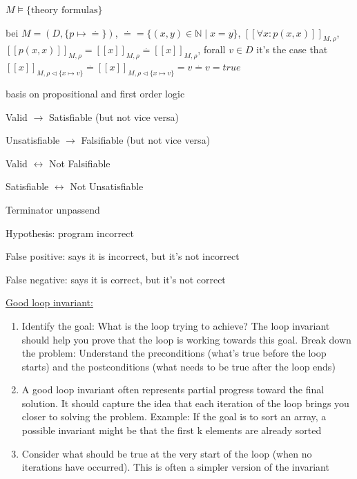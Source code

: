 \documentclass[landscape, a4paper]{article}
\begin{document}
\begin{minipage}[t]{0.2\linewidth}
\begin{betterlist}
		\item $M \models \{\text{theory formulas}\}$
		\item bei $M = (D,\{p \mapsto \overset{.}{=}\})$, $\overset{.}{=} {=} \{(x, y)\in \mathbb{N} \mid x = y\}$, $[[\forall x: p(x, x)]]_{M, \rho}$, $[[p(x, x)]]_{M, \rho} = [[x]]_{M, \rho} \overset{.}{=} [[x]]_{M, \rho}$, forall $v\in D$ it's the case that $[[x]]_{M, \rho\triangleleft\{x \mapsto v\}} \overset{.}{=} [[x]]_{M, \rho\triangleleft\{x \mapsto v\}} = v \overset{.}{=} v = true$
		\item basis on propositional and first order logic
		\begin{betterlist}
			\item Valid $\rightarrow$ Satisfiable (but not vice versa)
			\item Unsatisfiable $\rightarrow$ Falsifiable (but not vice versa)
			\item Valid $\leftrightarrow$ Not Falsifiable
			\item Satisfiable $\leftrightarrow$ Not Unsatisfiable
		\end{betterlist}
		\item Terminator unpassend
		\item \alert{Hypothesis:} program incorrect
		\begin{betterlist}
			\item \alert{False positive:} says it is incorrect, but it's not incorrect
			\item \alert{False negative:} says it is correct, but it's not correct
		\end{betterlist}
		\item \underline{Good loop invariant:}
		\begin{enumerate}
			\item Identify the goal: What is the loop trying to achieve? The loop invariant should help you prove that the loop is working towards this goal.
			Break down the problem: Understand the preconditions (what’s true before the loop starts) and the postconditions (what needs to be true after the loop ends)
			\item A good loop invariant often represents partial progress toward the final solution. It should capture the idea that each iteration of the loop brings you closer to solving the problem. Example: If the goal is to sort an array, a possible invariant might be that the first k elements are already sorted
			\item Consider what should be true at the very start of the loop (when no iterations have occurred). This is often a simpler version of the invariant

\end{enumerate}
\end{betterlist}
\end{minipage}
\end{document}
